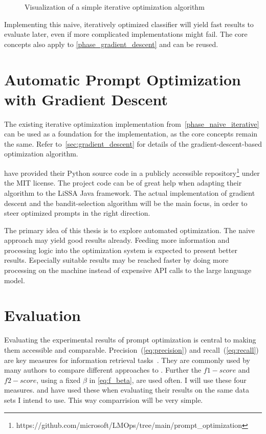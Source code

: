 \begin{figure}
    \centering
    
    \caption{Visualization of a simple iterative optimization algorithm}
    \label{fig:iterative_core_loop}
\end{figure}

Implementing this naive, iteratively optimized classifier will yield fast results to evaluate later, even if more complicated implementations might fail.
The core concepts also apply to \autoref{phase_gradient_descent} and can be reused.


\section{Automatic Prompt Optimization with Gradient Descent}
\label{approach:sec:gradient_descent}
The existing iterative optimization implementation from~\autoref{phase_naive_iterative} can be used as a foundation for the implementation, as the core concepts remain the same.
Refer to~\autoref{sec:gradient_descent} for details of the gradient-descent-based optimization algorithm.

 have provided their Python source code in a publicly accessible repository\footnote{https://github.com/microsoft/LMOps/tree/main/prompt\_optimization} under the MIT license.
The project code can be of great help when adapting their algorithm to the LiSSA Java framework.
The actual implementation of gradient descent and the bandit-selection algorithm will be the main focus, in order to steer optimized prompts in the right direction.

The primary idea of this thesis is to explore automated optimization.
The naive approach may yield good results already.
Feeding more information and processing logic into the optimization system is expected to present better results.
Especially suitable results may be reached faster by doing more processing on the machine instead of expensive API calls to the large language model.


\section{Evaluation}
\label{approach:sec:evaluation}
 Evaluating the experimental results of prompt optimization is central to making them accessible and comparable. 
 Precision~(\autoref{eq:precision}) and recall~(\autoref{eq:recall}) are key measures for information retrieval tasks~\cite{hayes2006AdvancingCandidate}.
 They are commonly used by many authors to compare different approaches to \TLR. 
 Further the $f1-score$ and $f2-score$, using a fixed $\beta$ in \autoref{eq:f_beta}, are used often.
I will use these four measures.
 and  have used these when evaluating their results on the same data sets I intend to use.
This way comparrision will be very simple.
 


